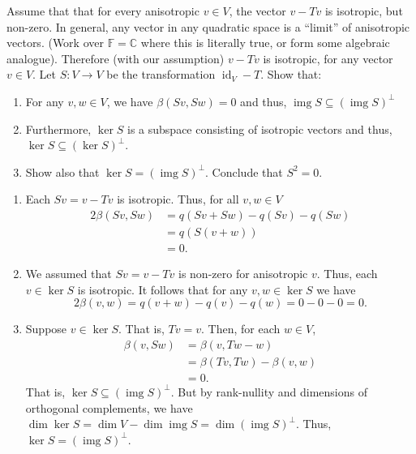 \documentclass[12 pt, letterpaper]{hmcpset}
\begin{document}
\begin{problem}[(4)]
	Assume that that for every anisotropic $v \in V$, the vector $v - Tv$ is isotropic, but non-zero. In general, any vector in any quadratic space is a ``limit'' of anisotropic vectors. (Work over $\mathbb{F} = \mathbb{C}$ where this is literally true, or form some algebraic analogue). Therefore (with our assumption) $v - Tv$ is isotropic, for any vector $v \in V$. Let $S : V \to V$ be the transformation $\operatorname{id}_{V} - T$. Show that:
	\begin{enumerate}
		\item For any $v, w \in V$, we have $\beta(Sv, Sw) = 0$ and thus, $\operatorname{img} S \subseteq (\operatorname{img} S)^{\perp}$

		\item Furthermore, $\ker S$ is a subspace consisting of isotropic vectors and thus, $\ker S \subseteq (\ker S)^{\perp}$.

		\item Show also that $\ker S = (\operatorname{img} S)^{\perp}$. Conclude that $S^{2} = 0$.
	\end{enumerate}
\end{problem}

\begin{solution}
	\begin{enumerate}
		\item Each $Sv = v - Tv$ is isotropic. Thus, for all $v, w \in V$
			\begin{align*}
				2 \beta(Sv, Sw) & = q(Sv + Sw) - q(Sv) - q(Sw) \\
						& = q(S(v + w)) \\
						& = 0.
			\end{align*}

		\item We assumed that $Sv = v - Tv$ is non-zero for anisotropic $v$. Thus, each $v \in \ker S$ is isotropic. It follows that for any $v, w \in \ker S$ we have
			\[
				2 \beta(v, w) = q(v + w) - q(v) - q(w) = 0 - 0 - 0 = 0.
			\]

		\item Suppose $v \in \ker S$. That is, $Tv = v$. Then, for each $w \in V$,
			\begin{align*}
				\beta(v, Sw) & = \beta(v, Tw - w) \\
					     & = \beta(Tv, Tw) - \beta(v, w) \\
					     & = 0.
			\end{align*}
			That is, $\ker S \subseteq (\operatorname{img} S)^{\perp}$. But by rank-nullity and dimensions of orthogonal complements, we have $\dim \ker S = \dim V - \dim \operatorname{img} S = \dim (\operatorname{img} S)^{\perp}$. Thus, $\ker S = (\operatorname{img} S)^{\perp}$.
	\end{enumerate}
\end{solution}
\end{document}
